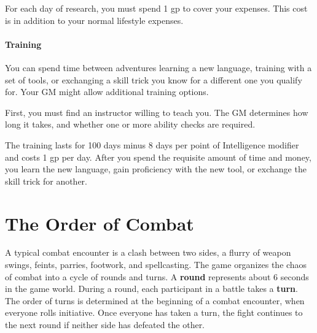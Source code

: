 For each day of research, you must spend 1 gp to cover your expenses. This cost is in addition to your normal lifestyle expenses.

\subsubsection{Training} \label{sub:training}

You can spend time between adventures learning a new language, training with a set of tools, or exchanging a skill trick you know for a different one you qualify for. Your GM might allow additional training options.

First, you must find an instructor willing to teach you. The GM determines how long it takes, and whether one or more ability checks are required.

The training lasts for 100 days minus 8 days per point of Intelligence modifier and costs 1 gp per day. After you spend the requisite amount of time and money, you learn the new language, gain proficiency with the new tool, or exchange the skill trick for another.

\chapter{The Order of Combat}\label{ch:order-of-combat}
A typical combat encounter is a clash between two sides, a flurry of weapon swings, feints, parries, footwork, and spellcasting. The game organizes the chaos of combat into a cycle of rounds and turns. A \textbf{round} represents about 6 seconds in the game world. During a round, each participant in a battle takes a \textbf{turn}. The order of turns is determined at the beginning of a combat encounter, when everyone rolls initiative. Once everyone has taken a turn, the fight continues to the next round if neither side has defeated the other.

